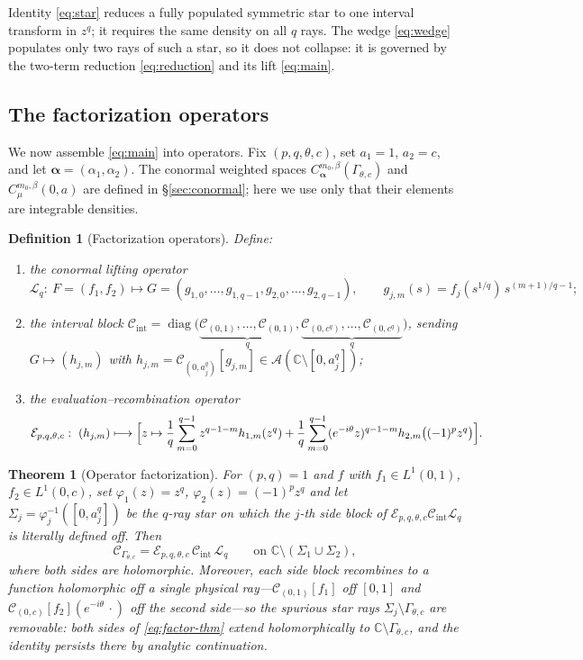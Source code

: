 \documentclass[pdflatex,sn-mathphys-num]{sn-jnl}%
\newcommand{\C}{\mathbb{C}}
\newcommand{\Cau}{\mathcal{C}}
\newcommand{\Gw}{\Gamma_{\theta,c}}
\newcommand{\bd}{\boldsymbol}
\newcommand{\Lq}{\mathcal{L}_{q}}
\newcommand{\Cint}{\mathcal{C}_{\mathrm{int}}}
\newcommand{\Eop}{\mathcal{E}_{p,q,\theta,c}}
\newcommand{\Ahol}{\mathcal{A}}
\theoremstyle{thmstyleone}
\newtheorem{theorem}{Theorem}
\theoremstyle{thmstyletwo}
\theoremstyle{thmstylethree}
\newtheorem{definition}{Definition}
\begin{document}
Identity \eqref{eq:star} reduces a fully populated symmetric star to one
interval transform in $z^{q}$; it requires the same density on all $q$ rays. The
wedge \eqref{eq:wedge} populates only two rays of such a star, so it does not
collapse: it is governed by the two-term reduction \eqref{eq:reduction} and its
lift \eqref{eq:main}.

\subsection{The factorization operators}
We now assemble \eqref{eq:main} into operators. Fix $(p,q,\theta,c)$, set
$a_1=1$, $a_2=c$, and let $\bd\alpha=(\alpha_1,\alpha_2)$. The conormal weighted
spaces $C^{m_0,\beta}_{\bd\alpha}(\Gw)$ and $C^{m_0,\beta}_\mu(0,a)$ are defined
in \S\ref{sec:conormal}; here we use only that their elements are integrable
densities.

\begin{definition}[Factorization operators]\label{def:factor-ops}
Define:
\begin{enumerate}
\item the \emph{conormal lifting operator}
\[
  \Lq:\ F=(f_1,f_2)\longmapsto
   G=(g_{1,0},\dots,g_{1,q-1},g_{2,0},\dots,g_{2,q-1}),\qquad
   g_{j,m}(s)=f_j(s^{1/q})\,s^{(m+1)/q-1};
\]
\item the \emph{interval block}
$\Cint=\operatorname{diag}\bigl(\underbrace{\Cau_{(0,1)},\dots,\Cau_{(0,1)}}_{q},
\underbrace{\Cau_{(0,c^{q})},\dots,\Cau_{(0,c^{q})}}_{q}\bigr)$, sending
$G\mapsto(h_{j,m})$ with $h_{j,m}=\Cau_{(0,a_j^{q})}[g_{j,m}]\in
\Ahol(\C\setminus[0,a_j^{q}])$;
\item the \emph{evaluation--recombination operator}
\[
  \Eop:\ (h_{j,m})\longmapsto
  \Bigl[z\mapsto
   \frac1q\sum_{m=0}^{q-1}z^{q-1-m}h_{1,m}(z^{q})
   +\frac1q\sum_{m=0}^{q-1}(e^{-i\theta}z)^{q-1-m}h_{2,m}\bigl((-1)^{p}z^{q}\bigr)
  \Bigr].
\]
\end{enumerate}
\end{definition}

\begin{theorem}[Operator factorization]\label{thm:factorization}
For $(p,q)=1$ and $f$ with $f_1\in L^1(0,1)$, $f_2\in L^1(0,c)$, set
$\varphi_1(z)=z^{q}$, $\varphi_2(z)=(-1)^{p}z^{q}$ and let
$\Sigma_j=\varphi_j^{-1}([0,a_j^{q}])$ be the $q$-ray star on which the $j$-th
side block of $\Eop\Cint\Lq$ is literally defined off. Then
\begin{equation}\label{eq:factor-thm}
  \Cau_{\Gw}=\Eop\,\Cint\,\Lq
  \qquad\text{on } \C\setminus(\Sigma_1\cup\Sigma_2),
\end{equation}
where both sides are holomorphic. Moreover, each side block recombines to a
function holomorphic off a single physical ray---$\Cau_{(0,1)}[f_1]$ off
$[0,1]$ and $\Cau_{(0,c)}[f_2](e^{-i\theta}\,\cdot)$ off the second
side---so the spurious star rays $\Sigma_j\setminus\Gw$ are removable: both
sides of \eqref{eq:factor-thm} extend holomorphically to $\C\setminus\Gw$, and
the identity persists there by analytic continuation.
\end{theorem}
\end{document}
